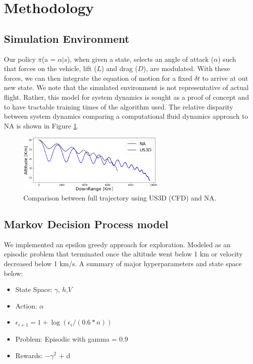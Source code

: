 \documentclass[11pt]{article} %
\begin{document}
\section{Methodology}
   \subsection{Simulation Environment}
   Our policy $\pi$(a = $\alpha|s$), when given a state, selects an angle of attack ($\alpha$) such that forces on the
   vehicle, lift ($L$) and drag ($D$), are modulated. With these forces, we can then integrate the equation of motion
   for a fixed $\delta t$ to arrive at out new state. We note that the simulated environment is not representative
   of actual flight. Rather, this model for system dynamics is sought as a proof of concept and to have tractable 
   training times of the algorithm used. The relative disparity between system dynamics comparing a computational  
   fluid dynamics approach to NA is shown in Figure \ref{fig:compare}.
   \begin{figure}[H]
      \centering
        \includegraphics[width=0.65\textwidth]{images/compare_alt.png}
        \caption{Comparison between full trajectory using US3D (CFD) and NA. }
        \label{fig:compare}

   \end{figure}
\subsection{Markov Decision Process model}
We implemented an epsilon greedy approach for exploration. Modeled as an episodic problem that terminated once the
altitude went below 1 km or velocity decreased below 1 km/s. A summary of major hyperparameters and state space below:
\begin{itemize}
   \item State Space: $\gamma$, $h$,$V$
   \item Action: $\alpha$
   \item $\epsilon_{i+1} = 1+ \log(\epsilon_i/(0.6*n))$
   \item  Problem: Episodic with gamma = 0.9 
   \item Rewards: $- \gamma^2$ + d
\end{itemize}
\end{document}
